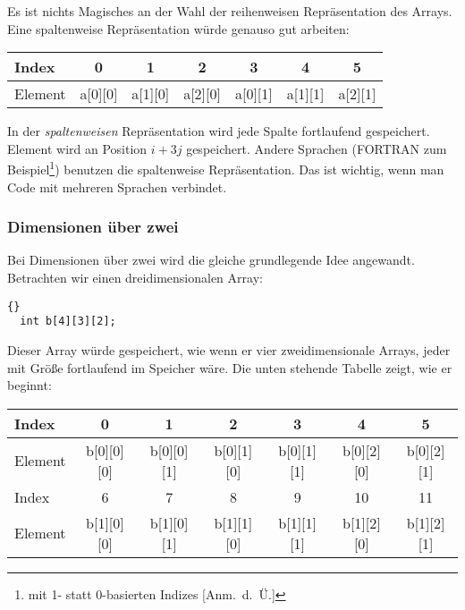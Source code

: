 Es ist nichts Magisches an der Wahl der reihenweisen Repr\"{a}sentation
des Arrays. Eine spaltenweise Repr\"{a}sentation w\"{u}rde genauso gut
arbeiten:

\parbox{\textwidth}{
\vspace{0.5em}
\centering
\begin{tabular}{||l|c|c|c|c|c|c||}
 \hline
 Index   &    0    &    1    &    2    &    3    &    4    &    5    \\
 \hline
 Element & a[0][0] & a[1][0] & a[2][0] & a[0][1] & a[1][1] & a[2][1]  \\
 \hline
\end{tabular}
\vspace{0.5em} }

\noindent In der \emph{spaltenweisen} Repr\"{a}sentation wird jede
Spalte fortlaufend gespeichert. Element {\code [i][j]} wird an
Position $i + 3j$ gespeichert. Andere Sprachen (FORTRAN zum
Beispiel\footnote{mit 1- statt 0-basierten Indizes [Anm.\ d.\
\"{U}\@.]}) benutzen die spaltenweise Repr\"{a}sentation. Das ist wichtig,
wenn man Code mit mehreren Sprachen verbindet.

\subsubsection{Dimensionen \"{u}ber zwei}
Bei Dimensionen \"{u}ber zwei wird die gleiche grundlegende Idee
angewandt. Betrachten wir einen dreidimensionalen Array:
\begin{lstlisting}[stepnumber=0]{}
  int b[4][3][2];
\end{lstlisting}
Dieser Array w\"{u}rde gespeichert, wie wenn er vier zweidimensionale
Arrays, jeder mit Gr\"{o}{\ss}e {\code [3][2]} fortlaufend im Speicher w\"{a}re.
Die unten stehende Tabelle zeigt, wie er beginnt:

\begin{center} %
\parbox{\textwidth}{
\vspace{0.5em} %
\begin{tabular}{||l|c|c|c|c|c|c||}
 \hline
 Index   &      0     &      1     &      2     &      3     & 4 & 5  \\
 \hline
 Element & b[0][0][0] & b[0][0][1] & b[0][1][0] & b[0][1][1]
         & b[0][2][0]  &  b[0][2][1]  \\
 \hline
 \hline
 Index   &      6     &      7     &      8     &      9     & 10 & 11 \\
 \hline
 Element & b[1][0][0] & b[1][0][1] & b[1][1][0] & b[1][1][1]
         & b[1][2][0] & b[1][2][1] \\
 \hline
\end{tabular}
\vspace{0.5em} %
}
\end{center} %

